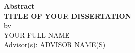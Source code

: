 \begin{center}
\textbf{Abstract} \\[0.5em]

\textbf{TITLE OF YOUR DISSERTATION} \\[2em]

by \\[0.5em]

YOUR FULL NAME \\[0.5em]

Advisor(s): ADVISOR NAME(S)
\end{center}

\vspace{0.5em}

\blindtext
